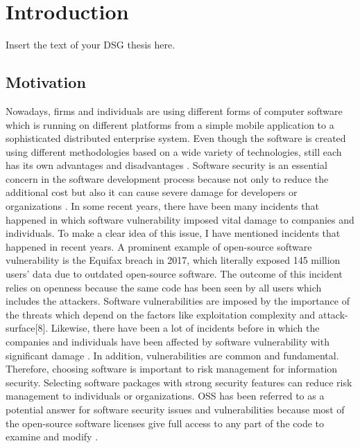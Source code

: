 %
\section{Introduction}\label{sec:introduction}
%
Insert the text of your \acs{DSG} thesis here.
\subsection{Motivation}
Nowadays, firms and individuals are using different forms of computer software which is running on different platforms from a simple mobile application to a sophisticated distributed enterprise system. Even though the software is created using different methodologies based on a wide variety of technologies, still each has its own advantages and disadvantages \cite{tur38}\cite{KaDaPeTu2014}. Software security is an essential concern in the software development process because not only to reduce the additional cost but also it can cause severe damage for developers or organizations \cite{fil2}. In some recent years, there have been many incidents that happened in which software vulnerability imposed vital damage to companies and individuals. To make a clear idea of this issue, I have mentioned incidents that happened in recent years. A prominent example of open-source software vulnerability is the Equifax breach in 2017, which literally exposed 145 million users' data due to outdated open-source software. The outcome of this incident relies on openness because the same code has been seen by all users which includes the attackers\cite{WinNT}. Software vulnerabilities are imposed by the importance of the threats which depend on the factors like exploitation complexity and attack-surface[8]. Likewise, there have been a lot of incidents before in which the companies and individuals have been affected by software vulnerability with significant damage \cite{tur38}. In addition, vulnerabilities are common and fundamental. Therefore, choosing software is important to risk management for information security. Selecting software packages with strong security features can reduce risk management to individuals or organizations. \acs{OSS} has been referred to as a potential answer for software security issues and vulnerabilities because most of the open-source software licenses give full access to any part of the code to examine and modify \cite{KeJaSa2005}.

